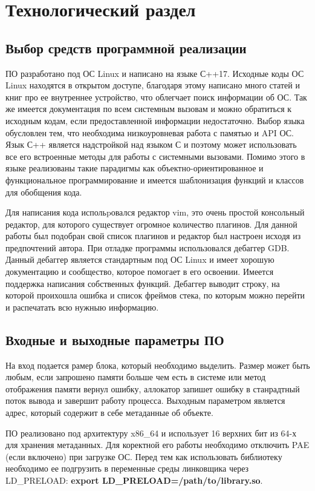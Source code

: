\chapter{Технологический раздел}
\section{Выбор средств программной реализации}
ПО разработано под ОС Linux и написано на языке С++17. Исходные коды ОС Linux находятся в открытом доступе, благодаря этому написано много статей и книг про ее внутреннее устройство, что облегчает поиск информации об ОС. Так же имеется документация по всем системным вызовам и можно обратиться к исходным кодам, если предоставленной информации недостаточно. Выбор языка обусловлен тем, что необходима низкоуровневая работа с памятью и API ОС. Язык С++ является надстройкой над языком С и поэтому может использовать все его встроенные методы для работы с системными вызовами. Помимо этого в языке реализованы такие парадигмы как объектно-ориентированное и функциональное программирование и имеется шаблонизация функций и классов для обобщения кода.

Для написания кода испольpовался редактор vim, это очень простой консольный редактор, для которого существует огромное количество плагинов. Для данной работы был подобран свой список плагинов и редактор был настроен исходя из предпочтений автора. При отладке программы использовался дебаггер GDB. Данный дебаггер является стандартным под ОС Linux и имеет хорошую документацию и сообщество, которое помогает в его освоении. Имеется поддержка написания собственных функций. Дебаггер выводит строку, на которой проихошла ошибка и список фреймов стека, по которым можно перейти и распечатать всю нужныю информацию.

\section{Входные и выходные параметры ПО}
На вход подается рамер блока, который необходимо выделить. Размер может быть любым, если запрошено памяти больше чем есть в системе или метод отображения памяти вернул ошибку, аллокатор запишет ошибку в станрадтный поток вывода и завершит работу процесса. Выходным параметром является адрес, который содержит в себе метаданные об объекте.

ПО реализовано под архитектуру x86\_64 и использует 16 верхних бит из 64-х для хранения метаданных. Для коректной его работы необходимо отключить PAE (если включено) при загрузке ОС. Перед тем как использовать библиотеку необходимо ее подгрузить в переменные среды линковщика через LD\_PRELOAD: \textbf{export LD\_PRELOAD=/path/to/library.so}.


